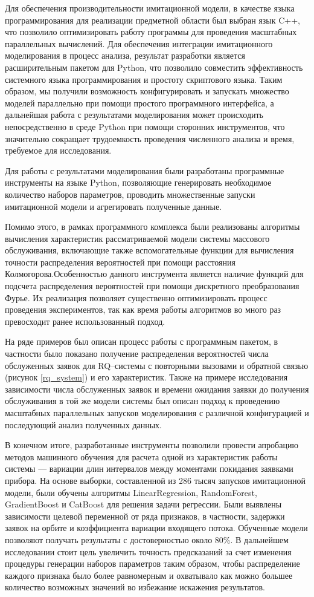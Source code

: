 Для обеспечения производительности имитационной модели, в качестве языка программирования для реализации предметной области был выбран язык C++, что позволило оптимизировать работу программы для проведения масштабных параллельных вычислений. Для обеспечения интеграции имитационного моделирования в процесс анализа, результат разработки является расширительным пакетом для Python, что позволило совместить эффективность системного языка программирования и простоту скриптового языка. Таким образом, мы получили возможность конфигурировать и запускать множество моделей параллельно при помощи простого программного интерфейса, а дальнейшая работа с результатами моделирования может происходить непосредственно в среде Python при помощи сторонних инструментов, что значительно сокращает трудоемкость проведения численного анализа и время, требуемое для исследования.

Для работы с результатами моделирования были разработаны программные инструменты на языке Python, позволяющие генерировать необходимое количество наборов параметров, проводить множественные запуски имитационной модели и агрегировать полученные данные.

Помимо этого, в рамках программного комплекса были реализованы алгоритмы вычисления характеристик рассматриваемой модели системы массового обслуживания, включающие также вспомогательные функции для вычисления точности распределения вероятностей при помощи расстояния Колмогорова.Особенностью данного инструмента является наличие функций для подсчета распределения вероятностей при помощи дискретного преобразования Фурье. Их реализация позволяет существенно оптимизировать процесс проведения экспериментов, так как время работы алгоритмов во много раз превосходит ранее использованный подход.

На ряде примеров был описан процесс работы с программным пакетом, в частности было показано получение распределения вероятностей числа обслуженных заявок для RQ--системы с повторными вызовами и обратной связью (рисунок \ref{rq_system}) и его характеристик. Также на примере исследования зависимости числа обслуженных заявок и времени ожидания заявки до получения обслуживания в той же модели системы был описан подход к проведению масштабных параллельных запусков моделирования с различной конфигурацией и последующий анализ полученных данных.

В конечном итоге, разработанные инструменты позволили провести апробацию методов машинного обучения для расчета одной из характеристик работы системы --- вариации длин интервалов между моментами покидания заявками прибора. На основе выборки, составленной из 286 тысяч запусков имитационной модели, были обучены алгоритмы LinearRegression, RandomForest, GradientBoost и CatBoost для решения задачи регрессии. Были выявлены зависимости целевой переменной от ряда признаков, в частности, задержки заявок на орбите и коэффициента вариации входящего потока. Обученные модели позволяют получать результаты с достоверностью около 80\%. В дальнейшем исследовании стоит цель увеличить точность предсказаний за счет изменения процедуры генерации наборов параметров таким образом, чтобы распределение каждого признака было более равномерным и охватывало как можно большее количество возможных значений во избежание искажения результатов.

